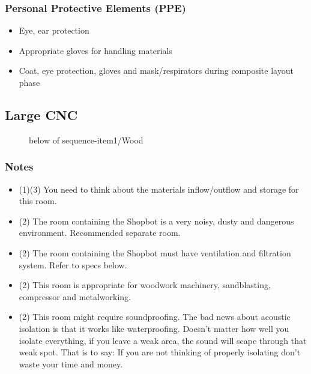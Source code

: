 \documentclass[a4paper,12pt,titlepage]{article}
\begin{document}
\subsubsection*{Personal Protective Elements (PPE)}
\begin{itemize}
\item Eye, ear protection
\item Appropriate gloves for handling materials
\item Coat, eye protection, gloves and mask/respirators during composite layout phase
\end{itemize}
\clearpage


\subsection{Large CNC}
\begin{figure}[h]

\centering
{}
{below of sequence-item1/{Wood}}
\vspace{1cm}
\end{figure}
\subsubsection*{Notes}
\begin{itemize}
\item (1)(3) You need to think about the materials inflow/outflow and storage for this room.
\item (2) The room containing the Shopbot is a very noisy, dusty and dangerous environment. Recommended separate room.
\item (2) The room containing the Shopbot must have ventilation and filtration system. Refer to specs below.
\item (2) This room is appropriate for woodwork machinery, sandblasting, compressor and metalworking.
\item (2) This room might require soundproofing. The bad news about acoustic isolation is that it works like waterproofing. Doesn't matter how well you isolate everything, if you leave a weak area, the sound will scape through that weak spot. That is to say: If you are not thinking of properly isolating don't waste your time and money. 
\end{itemize}
\end{document}
